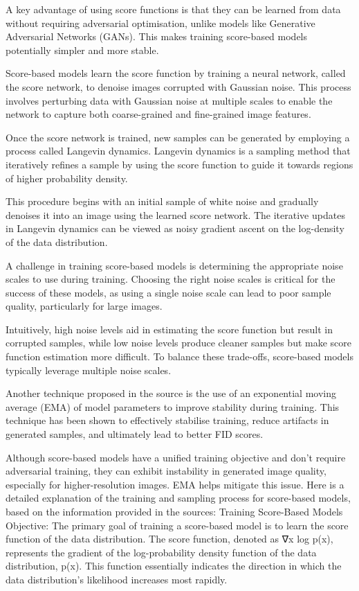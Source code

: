 \documentclass[
]{book}
\begin{document}
A key advantage of using score functions is that they can be learned from data without requiring adversarial optimisation, unlike models like Generative Adversarial Networks (GANs). This makes training score-based models potentially simpler and more stable.

Score-based models learn the score function by training a neural network, called the score network, to denoise images corrupted with Gaussian noise. This process involves perturbing data with Gaussian noise at multiple scales to enable the network to capture both coarse-grained and fine-grained image features.

Once the score network is trained, new samples can be generated by employing a process called Langevin dynamics. Langevin dynamics is a sampling method that iteratively refines a sample by using the score function to guide it towards regions of higher probability density.

This procedure begins with an initial sample of white noise and gradually denoises it into an image using the learned score network. The iterative updates in Langevin dynamics can be viewed as noisy gradient ascent on the log-density of the data distribution.

A challenge in training score-based models is determining the appropriate noise scales to use during training. Choosing the right noise scales is critical for the success of these models, as using a single noise scale can lead to poor sample quality, particularly for large images.

Intuitively, high noise levels aid in estimating the score function but result in corrupted samples, while low noise levels produce cleaner samples but make score function estimation more difficult. To balance these trade-offs, score-based models typically leverage multiple noise scales.

Another technique proposed in the source is the use of an exponential moving average (EMA) of model parameters to improve stability during training. This technique has been shown to effectively stabilise training, reduce artifacts in generated samples, and ultimately lead to better FID scores.

Although score-based models have a unified training objective and don't require adversarial training, they can exhibit instability in generated image quality, especially for higher-resolution images. EMA helps mitigate this issue.
Here is a detailed explanation of the training and sampling process for score-based models, based on the information provided in the sources:
Training Score-Based Models
Objective: The primary goal of training a score-based model is to learn the score function of the data distribution. The score function, denoted as ∇x log p(x), represents the gradient of the log-probability density function of the data distribution, p(x). This function essentially indicates the direction in which the data distribution's likelihood increases most rapidly.
\end{document}
